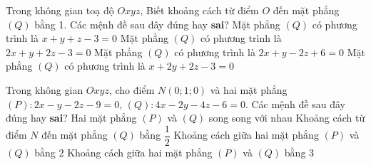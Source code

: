 \begin{ex}%
	Trong không gian toạ độ $Oxyz$, Biết khoảng cách từ điểm $O$ đến mặt phẳng $(Q)$ bằng 1. Các mệnh đề sau đây đúng hay \textbf{sai}?
	\choiceTF
	{Mặt phẳng $(Q)$ có phương trình là $x + y + z-3 = 0$}
	{\True Mặt phẳng $(Q)$ có phương trình là $2x + y + 2z-3 = 0$}
	{Mặt phẳng $(Q)$ có phương trình là $2x + y- 2z + 6 = 0$}
	{\True Mặt phẳng $(Q)$ có phương trình là $x + 2y + 2z-3= 0$}
\end{ex}

\begin{ex}%
	Trong không gian $Oxyz$, cho điểm $N(0;1;0)$ và hai mặt phẳng $(P)\colon 2x-y-2z-9=0$, $(Q)\colon 4x-2y-4z-6=0$. Các mệnh đề sau đây đúng hay \textbf{sai}?
	\choiceTF
	{\True Hai mặt phẳng $(P)$ và $(Q)$ song song với nhau}
	{Khoảng cách từ điểm $N$ đến mặt phẳng $(Q)$ bằng $\dfrac{1}{2}$}
	{\True Khoảng cách giữa hai mặt phẳng $(P)$ và $(Q)$ bằng $2$}
	{Khoảng cách giữa hai mặt phẳng $(P)$ và $(Q)$ bằng $3$}
\end{ex}

